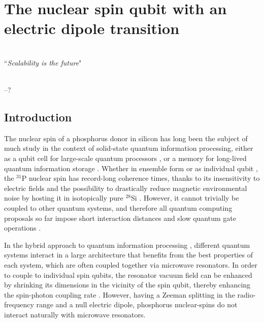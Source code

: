 
\chapter{The nuclear spin qubit with an electric dipole transition} %

\label{Chapter3} %

\HRule
\vspace{0.5cm} \hspace{2cm}
\small
\hangindent=4cm
\\
        ``\emph{Scalability is the future}"
\\ \\
\hangindent=4cm
\begin{flushright}
--? \\
\end{flushright}

\vspace{0.5cm}

\noindent \HRule
\clearpage


\section{Introduction}

The nuclear spin of a phosphorus donor in silicon has long been the subject of much study in the context of solid-state quantum information processing, either as a qubit cell for large-scale quantum processors \cite{Kane1998,OGorman2016,Hill2015}, or a memory for long-lived quantum information storage \cite{Morton2008,Freer2017}. Whether in ensemble form \cite{Saeedi2013} or as individual qubit \cite{Muhonen2014}, the $^{31}$P nuclear spin has record-long coherence times, thanks to its insensitivity to electric fields and the possibility to drastically reduce magnetic environmental noise by hosting it in isotopically pure $^{28}$Si \cite{Itoh2014}. However, it cannot trivially be coupled to other quantum systems, and therefore all quantum computing proposals so far impose short interaction distances and slow quantum gate operations \cite{Kane1998,OGorman2016,Hill2015}.

In the hybrid approach to quantum information processing \cite{Xiang2012}, different quantum systems interact in a large architecture that benefits from the best properties of each system, which are often coupled together via microwave resonators. In order to couple to individual spin qubits, the resonator vacuum field can be enhanced by shrinking its dimensions in the vicinity of the spin qubit, thereby enhancing the spin-photon coupling rate \cite{Tosi2017,Jenkins2016,Haikka2017,Sarabi2018}. However, having a Zeeman splitting in the radio-frequency range and a null electric dipole, phosphorus nuclear-spins do not interact naturally with microwave resonators.

